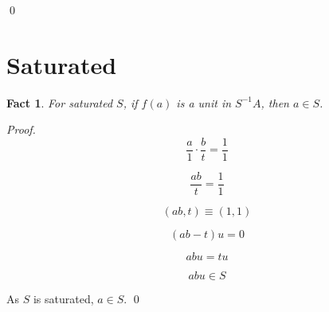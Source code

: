 \documentclass{article}
\newtheorem{theorem}{Fact}[section]
\begin{document}
\qed


\section{Saturated}

\begin{theorem}
For saturated $S$, if $f(a)$ is a unit in $S^{-1}A$, then $a \in S$.
\end{theorem}

\noindent
\textit{Proof.}
\[
  \frac{a}{1} \cdot \frac{b}{t} = \frac{1}{1} 
\]

\[
  \frac{ab}{t} = \frac{1}{1}
\]

\[
   (ab, t) \equiv (1, 1)
\]
 
\[
   (ab - t)u = 0
\]

\[
   abu = tu
\]

\[
   abu \in S
\]

As \( S \) is saturated, \( a \in S \).  \qed
\end{document}
